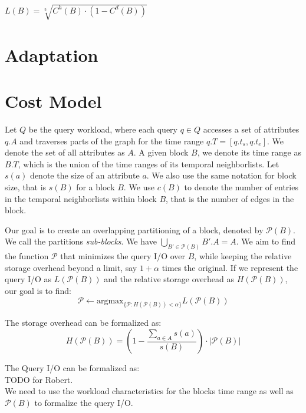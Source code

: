 \documentclass{sig-alternate}
\begin{document}
$L(B) = \sqrt[2]{C^h(B) \cdot ( 1 - C^d(B))}$



\section{Adaptation}

\section{Cost Model}

Let $Q$ be the query workload, where each query $q\in Q$ accesses a set of
attributes $q.A$ and traverses parts of the graph for the time range
$q.T=[q.t_s,q.t_e]$. We denote the set of all attributes as $A$. A given block
$B$, we denote its time range as $B.T$, which is the union of the time ranges
of its temporal neighborlists. Let $s(a)$ denote the size of an attribute $a$.
We also use the same notation for block size, that is $s(B)$ for a block $B$. 
We use $c(B)$ to denote the number of entries in the temporal neighborlists
within block $B$, that is the number of edges in the block. 

Our goal is to create an overlapping partitioning of a block, denoted by
$\mathcal{P}(B)$. We call the partitions \emph{sub-blocks}. We have
$\bigcup_{B'\in \mathcal{P}(B)} B'.A = A$. We aim to find the function
$\mathcal{P}$ that minimizes the query I/O over $B$, while keeping the
relative storage overhead beyond a limit, say $1+\alpha$ times the original.
If we represent the query I/O as $L(\mathcal{P}(B))$ and the relative storage
overhead as $H(\mathcal{P}(B))$, our goal is to find:
\begin{equation}
\mathcal{P} \leftarrow \mbox{argmax}_{\{\mathcal{P}: H(\mathcal{P}(B)) < \alpha\}} L(\mathcal{P}(B))
\end{equation}

The storage overhead can be formalized as:
\begin{equation}
H(\mathcal{P}(B)) = (1-\frac{\sum_{a\in A} s(a)}{s(B)})\cdot |\mathcal{P}(B)| 
\end{equation}

The Query I/O can be formalized as:\\
TODO for Robert.\\
We need to use the workload characteristics for the blocks time range as
well as $\mathcal{P}(B)$ to formalize the query I/O.\\



 
\end{document}
